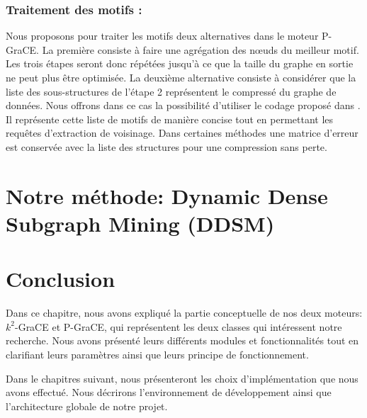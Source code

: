 \documentclass[a4paper,oneside,12pt]{report}
\theoremstyle{definition}
\begin{document}
		   
		\subsubsection{Traitement des motifs :}
		
		Nous proposons pour traiter les motifs deux alternatives dans le moteur P-GraCE. La première consiste à faire une agrégation des nœuds du meilleur motif. Les trois étapes seront donc répétées jusqu'à ce que la taille du graphe en sortie ne peut plus être optimisée. La deuxième alternative consiste à considérer que la liste des sous-structures de l'étape 2 représentent le compressé du graphe de données. Nous offrons dans ce cas la possibilité d'utiliser le codage proposé dans \citep{liu2018reducing}. Il représente cette liste de motifs de manière concise tout en permettant les requêtes d'extraction de voisinage. Dans certaines méthodes une matrice d'erreur est conservée avec la liste des structures pour une compression sans perte.
		
		
		
	\section{Notre méthode: Dynamic Dense Subgraph Mining (DDSM)}
		
	
	\section{Conclusion}

Dans ce chapitre, nous avons expliqué la partie conceptuelle de nos deux moteurs: $k^2$-GraCE et P-GraCE, qui  représentent les deux classes qui intéressent notre recherche. Nous avons présenté leurs différents modules et fonctionnalités tout en clarifiant leurs paramètres ainsi que leurs principe de fonctionnement.

	Dans le chapitres suivant, nous présenteront les choix d'implémentation que nous avons effectué. Nous décrirons l'environnement de développement ainsi que l'architecture globale de notre projet. 
	
	
	

	


	
	





\end{document}
